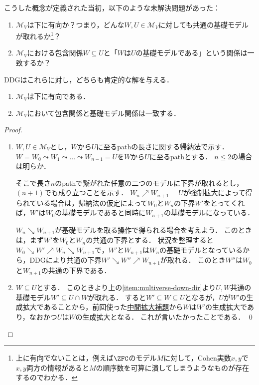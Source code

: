 \documentclass[a4j,leqno]{ltjsarticle}
\newcommand{\DDG}{\mathord{\mathrm{DDG}}}
\begin{document}
こうした概念が定義された当初，以下のような未解決問題があった：
\begin{question}
 \begin{enumerate}
  \item $\mathcal{M}_V$は下に有向か？つまり，どんな$W, U \in \mathcal{M}_V$に対しても共通の基礎モデルが取れるか\footnote{上に有向でないことは，例えば$\ZFC$のモデル$M$に対して，Cohen実数$x,y$で$x,y$両方の情報があると$M$の順序数を可算に潰してしまうようなものが存在するのでわかる．}？
  \item $\mathcal{M}_V$における包含関係$W \subseteq U$と「$W$は$U$の基礎モデルである」という関係は一致するか？
 \end{enumerate}
\end{question}

$\DDG$はこれらに対し，どちらも肯定的な解を与える．

\begin{lemma}
 \begin{enumerate}
  \item \label{item:multiverse-down-dir}$\mathcal{M}_V$は下に有向である．
  \item $\mathcal{M}_V$において包含関係と基礎モデル関係は一致する．
 \end{enumerate}
\end{lemma}
\begin{proof}
 \begin{enumerate}
  \item $W, U \in \mathcal{M}_V$とし，$W$から$U$に至るpathの長さに関する帰納法で示す．
        $W = W_0 \leadsto W_1 \leadsto \dots \leadsto W_{n-1} = U$を$W$から$U$に至るpathとする．
        $n \leq 2$の場合は明らか．

        そこで長さ$n$のpathで繋がれた任意の二つのモデルに下界が取れるとし，$(n+1)$でも成り立つことを示す．
        $W_n \nearrow W_{n+1} = U$が強制拡大によって得られている場合は，帰納法の仮定によって$W_0$と$W_n$の下界$W'$をとってくれば，$W'$は$W_0$の基礎モデルであると同時に$W_{n+1}$の基礎モデルになっている．

        $W_n \searrow W_{n+1}$が基礎モデルを取る操作で得られる場合を考えよう．
        このときは，まず$W'$を$W_0$と$W_n$の共通の下界とする．
        状況を整理すると$W_0 \searrow W' \nearrow W_n \searrow W_{n+1}$で，$W'$と$W_{n+1}$は$W_n$の基礎モデルとなっているから，$\DDG$により共通の下界$W' \searrow W'' \nearrow W_{n+1}$が取れる．
        このとき$W''$は$W_0$と$W_{n+1}$の共通の下界である．
  \item $W \subseteq U$とする．
        このときより上の\ref{item:multiverse-down-dir}より$U, W$共通の基礎モデル$W' \subseteq U \cap W$が取れる．
        すると$W' \subseteq W \subseteq U$となるが，$U$が$W'$の生成拡大であることから，前回使った\href{https://konn-san.com/math/geology-ground-definability.html\#lem:interm-ext}{中間拡大補題}から$W$は$W'$の生成拡大であり，なおかつ$U$は$W$の生成拡大となる．
        これが言いたかったことである． \qed
 \end{enumerate}
\end{proof}
\end{document}
